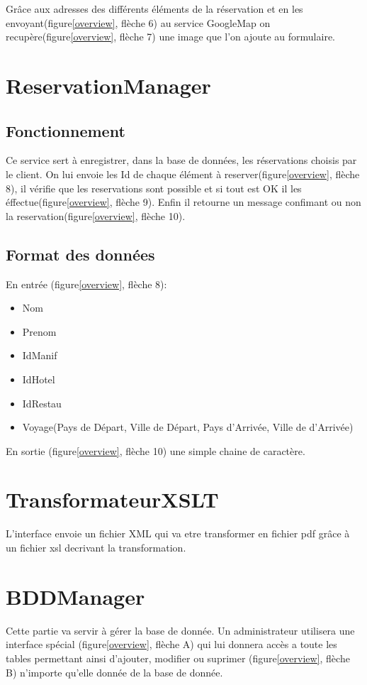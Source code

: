 		Grâce aux adresses des différents éléments de la réservation et en les
		envoyant(figure\ref{overview}, flèche 6) au service GoogleMap on
		recupère(figure\ref{overview}, flèche 7) une image que l'on ajoute au
		formulaire.
	
	\section{ReservationManager}	
	
		\subsection{Fonctionnement}
	
			Ce service sert à enregistrer, dans la base de données, les réservations
			choisis par le client. On lui envoie les Id de chaque élément à
			reserver(figure\ref{overview}, flèche 8), il vérifie que les reservations
			sont possible et si tout est OK il les éffectue(figure\ref{overview}, flèche
			9). Enfin il retourne un message confimant ou non la
			reservation(figure\ref{overview}, flèche 10).
	
		\subsection{Format des données}
		
			En entrée (figure\ref{overview}, flèche 8):
			\begin{itemize}
			  \item Nom
			  \item Prenom
			  \item IdManif
			  \item IdHotel
			  \item IdRestau
			  \item Voyage(Pays de Départ, Ville de Départ, Pays d'Arrivée, Ville de
			  d'Arrivée)\\
			\end{itemize}
	
			En sortie (figure\ref{overview}, flèche 10) une simple chaine de caractère.
	
	\section{TransformateurXSLT}
	
		L'interface envoie un fichier XML qui va etre transformer en fichier pdf grâce
		à un fichier xsl decrivant la transformation. 
	
	\section{BDDManager}
		
		Cette partie va servir à gérer la base de donnée. Un administrateur utilisera
		une interface spécial (figure\ref{overview}, flèche A) qui lui donnera accès
		a toute les tables permettant ainsi d'ajouter, modifier ou
		suprimer (figure\ref{overview}, flèche B) n'importe qu'elle donnée de la base
		de donnée.
		
\clearpage
